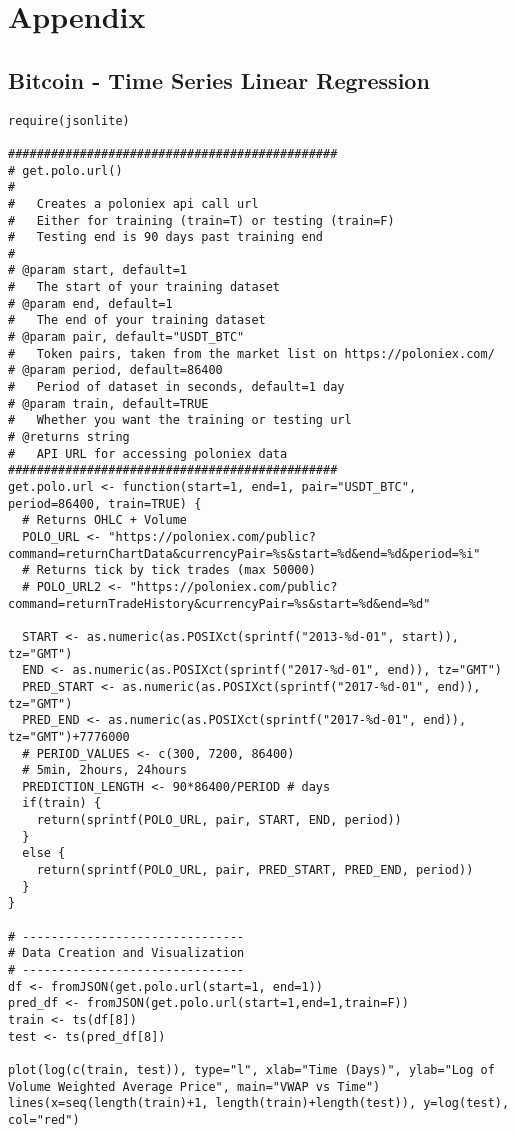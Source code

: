 \section {Appendix}
\subsection{Bitcoin - Time Series Linear Regression}
\begin{verbatim}
require(jsonlite)

##############################################
# get.polo.url()
#
#   Creates a poloniex api call url
#   Either for training (train=T) or testing (train=F)
#   Testing end is 90 days past training end
#
# @param start, default=1
#   The start of your training dataset
# @param end, default=1
#   The end of your training dataset
# @param pair, default="USDT_BTC"
#   Token pairs, taken from the market list on https://poloniex.com/
# @param period, default=86400
#   Period of dataset in seconds, default=1 day
# @param train, default=TRUE
#   Whether you want the training or testing url
# @returns string
#   API URL for accessing poloniex data
##############################################
get.polo.url <- function(start=1, end=1, pair="USDT_BTC", period=86400, train=TRUE) {
  # Returns OHLC + Volume
  POLO_URL <- "https://poloniex.com/public?command=returnChartData&currencyPair=%s&start=%d&end=%d&period=%i"
  # Returns tick by tick trades (max 50000)
  # POLO_URL2 <- "https://poloniex.com/public?command=returnTradeHistory&currencyPair=%s&start=%d&end=%d"

  START <- as.numeric(as.POSIXct(sprintf("2013-%d-01", start)), tz="GMT")
  END <- as.numeric(as.POSIXct(sprintf("2017-%d-01", end)), tz="GMT")
  PRED_START <- as.numeric(as.POSIXct(sprintf("2017-%d-01", end)), tz="GMT")
  PRED_END <- as.numeric(as.POSIXct(sprintf("2017-%d-01", end)), tz="GMT")+7776000
  # PERIOD_VALUES <- c(300, 7200, 86400)
  # 5min, 2hours, 24hours
  PREDICTION_LENGTH <- 90*86400/PERIOD # days
  if(train) {
    return(sprintf(POLO_URL, pair, START, END, period))
  }
  else {
    return(sprintf(POLO_URL, pair, PRED_START, PRED_END, period))
  }
}

# -------------------------------
# Data Creation and Visualization
# -------------------------------
df <- fromJSON(get.polo.url(start=1, end=1))
pred_df <- fromJSON(get.polo.url(start=1,end=1,train=F))
train <- ts(df[8])
test <- ts(pred_df[8])

plot(log(c(train, test)), type="l", xlab="Time (Days)", ylab="Log of Volume Weighted Average Price", main="VWAP vs Time")
lines(x=seq(length(train)+1, length(train)+length(test)), y=log(test), col="red")


\end{verbatim}
